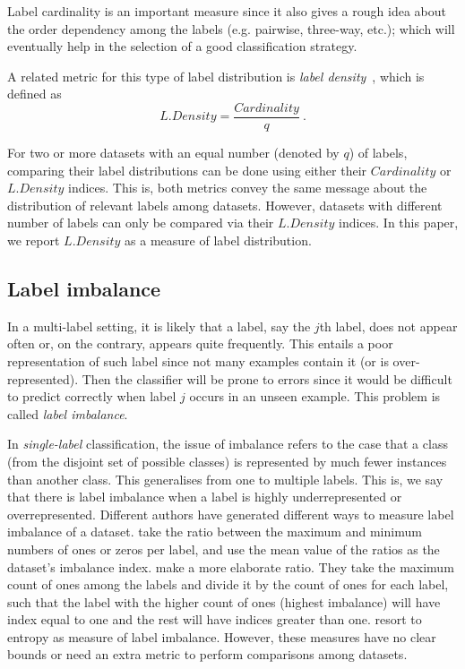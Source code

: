\documentclass[review]{elsarticle}
\begin{document}
	Label cardinality is an important measure since it also gives a rough idea about the order dependency among the labels (e.g. pairwise, three-way, etc.); which will eventually help in the selection of a good classification strategy.
	
	A related metric for this type of label distribution is \emph{label density}~\citep{Tsoumakas:07,Gibaja:15}, which is defined as
	\begin{equation}
	L.Density = \frac{Cardinality}{q}\ .
	\end{equation}
	
	For two or more datasets with an equal number (denoted by $q$) of labels, comparing their label distributions can be done using either their $Cardinality$ or $L.Density$ indices. This is, both metrics convey the same message about the distribution of relevant labels among datasets. However, datasets with different number of labels can only be compared via their $L.Density$ indices. In this paper, we report $L.Density$ as a measure of label distribution.
	
	\subsection{Label imbalance}
	
	In a multi-label setting, it is likely that a label, say the $j$th label, does not appear often or, on the contrary, appears quite frequently. This entails a poor representation of such label since not many examples contain it (or is over-represented). Then the classifier will be prone to errors since it would be difficult to predict correctly when label $j$ occurs in an unseen example. This problem is called \emph{label imbalance}.
	
	In \emph{single-label} classification, the issue of imbalance refers to the case that a class (from the disjoint set of possible classes) is represented by much fewer instances than another class. This generalises from one to multiple labels. This is, we say that there is label imbalance when a label is highly underrepresented or overrepresented. Different authors have generated different ways to measure label imbalance of a dataset. \citet{LIEG1} take the ratio between the maximum and minimum numbers of ones or zeros per label, and use the mean value of the ratios as the dataset's imbalance index. \citet{LIEG2} make a more elaborate ratio. They take the maximum count of ones among the labels and divide it by the count of ones for each label, such that the label with the higher count of ones (highest imbalance) will have index equal to one and the rest will have indices greater than one.  \citet{LIEG3} resort to entropy as measure of label imbalance. However, these measures have no clear bounds or need an extra metric to perform comparisons among datasets.
	
\end{document}
